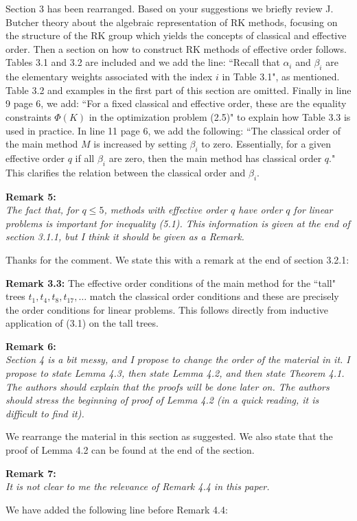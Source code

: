 \documentclass[12pt]{article}
\newcommand{\remark}[2]{\vspace{25pt} \noindent \textbf{Remark #1:\newline} \textit{#2}\vspace{15pt}}
\renewcommand{\newline}{\vspace{15pt}\\}
\begin{document}
Section 3 has been rearranged. 
Based on your suggestions we briefly review J. Butcher theory about the algebraic representation
of RK methods, focusing on the structure of the RK group which yields the concepts of classical 
and effective order.
Then a section on how to construct RK methods of effective order follows.
Tables 3.1 and 3.2 are included and we add the line:
``Recall that $\alpha_i$ and $\beta_i$ are the elementary weights associated 
with the index $i$ in Table 3.1",
as mentioned.
Table 3.2 and examples in the first part of this section are omitted. 
Finally in line 9 page 6, we add:
``For a fixed classical and effective order, these are the equality constraints 
$\Phi(K)$ in the optimization problem (2.5)"
to explain how Table 3.3 is used in practice.
In line 11 page 6, we add the following:
``The classical order of the main method $M$ is increased by setting $\beta_i$
to zero. 
Essentially, for a given effective order $q$ if all $\beta_i$ are zero, then
the main method has classical order $q$."
This clarifies the relation between the classical order and $\beta_i$.

\remark{5}{
The fact that, for $q \leq 5$, methods with effective order $q$ have order $q$ 
for linear problems is important for inequality (5.1). 
This information is given at the end of section 3.1.1, but I think it should be given as a Remark.}

Thanks for the comment. We state this with a remark at the end of section 3.2.1: 

\textbf{Remark 3.3:} The effective order conditions of the main method for the ``tall" trees 
$t_1, t_4, t_8, t_{17}, \dots$ match the classical order conditions
and these are precisely the order conditions for linear problems.
This follows directly from inductive application of (3.1)
on the tall trees.

\remark{6}{
Section 4 is a bit messy, and I propose to change the order of the material in it. 
I propose to state Lemma 4.3, then state Lemma 4.2, and then state Theorem 4.1. 
The authors should explain that the proofs will be done later on. 
The authors should stress the beginning of proof of Lemma 4.2 (in a quick reading, 
it is difficult to find it).}

We rearrange the material in this section as suggested.
We also state that the proof of Lemma 4.2 can be found at the end of the section.

\remark{7}{
It is not clear to me the relevance of Remark 4.4 in this paper.}

We have added the following line before Remark 4.4:
\end{document}
